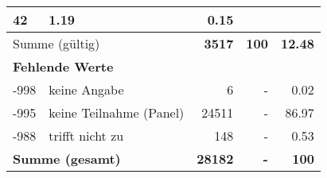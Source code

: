 \begin{longtable}{lXrrr}
       \num{42} &
       \num[round-mode=places,round-precision=2]{1,19} &
         \num[round-mode=places,round-precision=2]{0,15} \\
     \midrule
     \multicolumn{2}{l}{Summe (gültig)} &
       \textbf{\num{3517}} &
     \textbf{100} &
       \textbf{\num[round-mode=places,round-precision=2]{12,48}} \\
     \multicolumn{5}{l}{\textbf{Fehlende Werte}}\\
       -998 &
       keine Angabe &
         \num{6} &
        - &
         \num[round-mode=places,round-precision=2]{0,02} \\
       -995 &
       keine Teilnahme (Panel) &
         \num{24511} &
        - &
         \num[round-mode=places,round-precision=2]{86,97} \\
       -988 &
       trifft nicht zu &
         \num{148} &
        - &
         \num[round-mode=places,round-precision=2]{0,53} \\
     \midrule
     \multicolumn{2}{l}{\textbf{Summe (gesamt)}} &
          \textbf{\num{28182}} &
        \textbf{-} &
        \textbf{100} \\
     \bottomrule
     \end{longtable}
     
